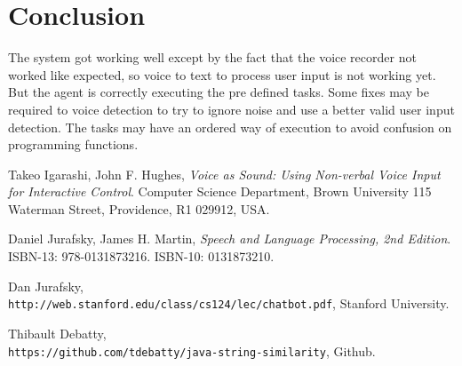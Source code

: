 \documentclass[
	article,			%
	11pt,				%
	oneside,			%
	a4paper,			%
	english,			%
	english,				%
	]{abntex2}
\begin{document}
\section{Conclusion}

The system got working well except by the fact that the voice recorder not worked like expected, so
voice to text to process user input is not working yet. But the agent is correctly executing the pre
defined tasks. Some fixes may be required to voice detection to try to ignore noise and use a better valid
user input detection. The tasks may have an ordered way of execution to avoid confusion on
programming functions.

\medskip




\begin{thebibliography}{9}

Takeo Igarashi, John F. Hughes, 
\textit{Voice as Sound: Using Non-verbal Voice Input for Interactive Control}. 
Computer Science Department, Brown University 115 Waterman Street, Providence, R1 029912, USA.
 
Daniel Jurafsky, James H. Martin, 
\textit{Speech and Language Processing, 2nd Edition}.
ISBN-13: 978-0131873216.
ISBN-10: 0131873210.
 
Dan	Jurafsky, 
\\\texttt{http://web.stanford.edu/class/cs124/lec/chatbot.pdf},
Stanford University.

Thibault Debatty, 
\\\texttt{https://github.com/tdebatty/java-string-similarity},
Github.

\end{thebibliography}
 
\end{document}
